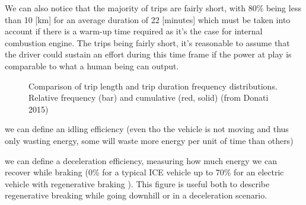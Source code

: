 We can also notice that the majority of trips are fairly short, with 80\% being less than 10 [km] for an average duration of 22 [minutes] which must be taken into account if there is a warm-up time required as it's the case for internal combustion engine. The trips being fairly short, it's reasonable to assume that the driver could sustain an effort during this time frame if the power at play is comparable to what a human being can output.

\begin{figure}[h!]
    \centering
    \hfill
    \caption{Comparison of trip length and trip duration frequency distributions. Relative frequency (bar) and cumulative (red, solid) (from Donati 2015\cite{donati_individual_2015})}
    \label{fig:trips-comparison}
\end{figure}

we can define an idling efficiency (even tho the vehicle is not moving and thus only wasting energy, some will waste more energy per unit of time than others)

we can define a deceleration efficiency, measuring how much energy we can recover while braking (0\% for a typical ICE vehicle up to 70\% for an electric vehicle with regenerative braking \cite{noauthor_regenerative_nodate}). This figure is useful both to describe regenerative breaking while going downhill or in a deceleration scenario.

